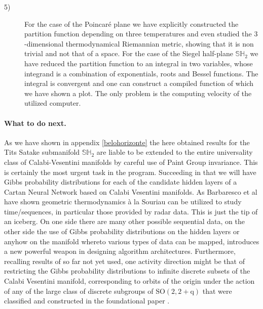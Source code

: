 \documentclass[10pt,a4paper]{article}
\begin{document}
\begin{description}
   \item[5)] For the case of the Poincar\'e plane we have explicitly constructed the partition function depending on three temperatures and even studied the $3$-dimensional thermodynamical Riemannian metric, showing that it is non trivial and not that of a space. For the case of the Siegel half-plane $\mathbb{SH}_2$
        we have reduced the partition function to an integral in two variables, whose integrand is a combination of exponentials, roots and Bessel functions. The integral is convergent and one can construct a compiled function of which we have shown a plot. The only problem is the computing velocity of the utilized computer.
\end{description}
\paragraph{What to do next.}
As we have shown in appendix \ref{belohorizonte} the here obtained results for the Tits Satake submanifold $\mathbb{SH}_2$ are liable to be extended to the entire universality class of Calabi-Vesentini manifolds by careful use of
Paint Group invariance. This is certainly the most urgent task in the program. Succeeding in that we will have Gibbs probability distributions for each of the candidate hidden layers of a Cartan Neural Network based on Calabi Vesentini manifolds. As Barbaresco et al have shown \cite{marlentropia,caldobarbaresco,barbaresco2,barbaresco3,marlegibbs} geometric thermodynamics {\`a} la Souriau can be utilized to study time/sequences, in particular those provided by radar data. This is just the tip of an iceberg. On one side there are many other possible sequential data, on the other side the use of Gibbs probability distributions on the hidden layers or anyhow on the manifold whereto various types of data can be mapped, introduces a new powerful weapon in designing algorithm architectures. Furthermore, recalling results of
\cite{pgtstheory} so far not yet used, one activity direction might be that of restricting the Gibbs probability distributions to infinite discrete subsets of the Calabi Vesentini manifold, corresponding to orbits of the origin under the action of any of the large class of discrete subgroups of $\mathrm{SO(2,2+q)}$ that were classified and constructed in the foundational paper \cite{pgtstheory}.
\end{document}
